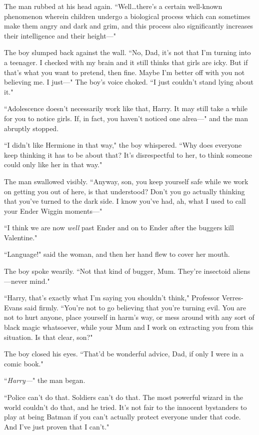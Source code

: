 The man rubbed at his head again. ``Well…there's a certain well-known phenomenon wherein children undergo a biological process which can sometimes make them angry and dark and grim, and this process also significantly increases their intelligence and their height—"

The boy slumped back against the wall. ``No, Dad, it's not that I'm turning into a teenager. I checked with my brain and it still thinks that girls are icky. But if that's what you want to pretend, then fine. Maybe I'm better off with you not believing me. I just—" The boy's voice choked. ``I just couldn't stand lying about it."

``Adolescence doesn't necessarily work like that, Harry. It may still take a while for you to notice girls. If, in fact, you haven't noticed one alrea—" and the man abruptly stopped.

``I didn't like Hermione in that way," the boy whispered. ``Why does everyone keep thinking it has to be about that? It's disrespectful to her, to think someone could only like her in that way."

The man swallowed visibly. ``Anyway, son, you keep yourself safe while we work on getting you out of here, is that understood? Don't you go actually thinking that you've turned to the dark side. I know you've had, ah, what I used to call your Ender Wiggin moments—"

``I think we are now \emph{well} past Ender and on to Ender after the buggers kill Valentine."

``Language!" said the woman, and then her hand flew to cover her mouth.

The boy spoke wearily. ``Not that kind of bugger, Mum. They're insectoid aliens—never mind."

``Harry, that's exactly what I'm saying you shouldn't think," Professor Verres-Evans said firmly. ``You're not to go believing that you're turning evil. You are not to hurt anyone, place yourself in harm's way, or mess around with any sort of black magic whatsoever, while your Mum and I work on extracting you from this situation. Is that clear, son?"

The boy closed his eyes. ``That'd be wonderful advice, Dad, if only I were in a comic book."

``\emph{Harry—}" the man began.

``Police can't do that. Soldiers can't do that. The most powerful wizard in the world couldn't do that, and he tried. It's not fair to the innocent bystanders to play at being Batman if you can't actually protect everyone under that code. And I've just proven that I can't."

